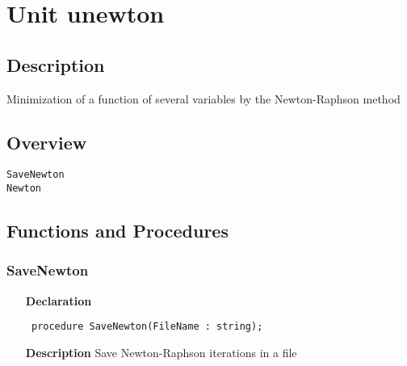 \documentclass[12pt,a4paper,oneside]{report}
\newcommand{\declarationitem}[1]{\textbf{#1}}
\newcommand{\descriptiontitle}[1]{\textbf{#1}}
\newcommand{\code}[1]{\texttt{#1}}
\begin{document}
\section{Unit unewton}
\label{unewton}
\subsection{Description}
Minimization of a function of several variables by the Newton{-}Raphson method 
\subsection{Overview}
\begin{description}
	\item[\texttt{SaveNewton}]
	\item[\texttt{Newton}]
\end{description}
\subsection{Functions and Procedures}
\subsubsection{SaveNewton}
\label{unewton-SaveNewton}
\begin{itemize}\item[\declarationitem{Declaration}\hfill]
	\begin{flushleft}
		\code{
			procedure SaveNewton(FileName : string);}
		
	\end{flushleft}
	
	\par
	\item[\descriptiontitle{Description}]
	Save Newton{-}Raphson iterations in a file
	
\end{itemize}
\end{document}
